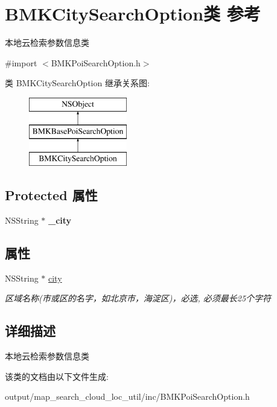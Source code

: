 \hypertarget{interface_b_m_k_city_search_option}{\section{B\+M\+K\+City\+Search\+Option类 参考}
\label{interface_b_m_k_city_search_option}
}


本地云检索参数信息类  




{\ttfamily \#import $<$B\+M\+K\+Poi\+Search\+Option.\+h$>$}

类 B\+M\+K\+City\+Search\+Option 继承关系图\+:\begin{figure}[H]
\begin{center}
\leavevmode
\includegraphics[height=3.000000cm]{interface_b_m_k_city_search_option}
\end{center}
\end{figure}
\subsection*{Protected 属性}
\begin{DoxyCompactItemize}
\item 
\hypertarget{interface_b_m_k_city_search_option_a6d14cd2f7fcac7cd601ef9bfd0439720}{N\+S\+String $\ast$ {\bfseries \+\_\+city}}\label{interface_b_m_k_city_search_option_a6d14cd2f7fcac7cd601ef9bfd0439720}

\end{DoxyCompactItemize}
\subsection*{属性}
\begin{DoxyCompactItemize}
\item 
\hypertarget{interface_b_m_k_city_search_option_af9e2e37c3edcd43445f58660e770f8b1}{N\+S\+String $\ast$ \hyperlink{interface_b_m_k_city_search_option_af9e2e37c3edcd43445f58660e770f8b1}{city}}\label{interface_b_m_k_city_search_option_af9e2e37c3edcd43445f58660e770f8b1}

\begin{DoxyCompactList}\small\item\em 区域名称(市或区的名字，如北京市，海淀区)，必选, 必须最长25个字符 \end{DoxyCompactList}\end{DoxyCompactItemize}


\subsection{详细描述}
本地云检索参数信息类 

该类的文档由以下文件生成\+:\begin{DoxyCompactItemize}
\item 
output/map\+\_\+search\+\_\+cloud\+\_\+loc\+\_\+util/inc/B\+M\+K\+Poi\+Search\+Option.\+h\end{DoxyCompactItemize}
